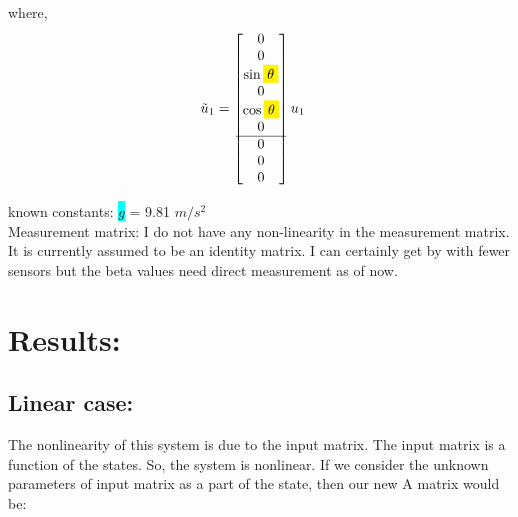 \documentclass[12pt]{article}
\begin{document}
where, 
\begin{align*}
    \tilde{u}_1 &= \begin{bmatrix}
        0 \\
        0 \\
        \sin{\colorbox{yellow}{$\theta$}} \\
        0 \\
        \cos{\colorbox{yellow}{$\theta$}} \\
        0 \\
        \hline
        0 \\
        0 \\
        0 \\
    \end{bmatrix} u_1
\end{align*}

known constants: \colorbox{cyan}{$g$} = 9.81 $m/s^2$ \\

Measurement matrix: I do not have any non-linearity in the measurement matrix. It is currently assumed to be an identity matrix. I can certainly get by with fewer sensors but the beta values need direct measurement as of now.

\pagebreak
\section*{Results:}

\subsection*{Linear case:}
The nonlinearity of this system is due to the input matrix. The input matrix is a function of the states. So, the system is nonlinear. If we consider the unknown parameters of input matrix as a part of the state, then our new A matrix would be:
\end{document}
